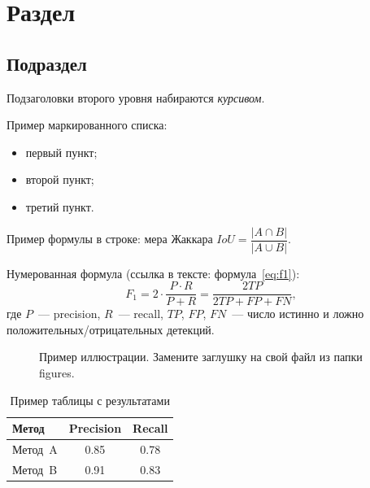 \documentclass{misisarticle}
\begin{document}
\section{Раздел}

\subsection{Подраздел}

Подзаголовки второго уровня набираются \textit{курсивом}.

Пример маркированного списка:
\begin{itemize}
  \item первый пункт;
  \item второй пункт;
  \item третий пункт.
\end{itemize}

Пример формулы в строке: мера Жаккара $IoU = \dfrac{|A \cap B|}{|A \cup B|}$.

Нумерованная формула (ссылка в тексте: формула~\eqref{eq:f1}):
\begin{equation}
  F_1 = 2 \cdot \frac{P \cdot R}{P + R}
       = \frac{2TP}{2TP + FP + FN},
  \label{eq:f1}
\end{equation}
где $P$~--- precision, $R$~--- recall, $TP$, $FP$, $FN$~--- число истинно и ложно положительных/отрицательных детекций.

\begin{figure}[htbp]
  \centering
  \caption{Пример иллюстрации. Замените заглушку на свой файл из папки figures.}
  \label{fig:example}
\end{figure}

\begin{table}[htbp]
  \caption{Пример таблицы с результатами}
  \label{tab:example}
  \centering
  \begin{tabular}{lcc}
    \toprule
    \textbf{Метод} & \textbf{Precision} & \textbf{Recall} \\
    \toprule
    Метод~A & 0.85 & 0.78 \\
    Метод~B & 0.91 & 0.83 \\
    \bottomrule
  \end{tabular}
\end{table}

\end{document}
